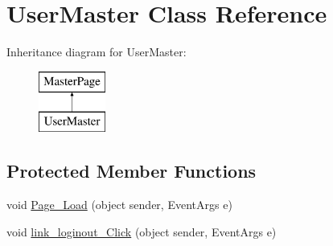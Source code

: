 \hypertarget{class_user_master}{}\section{User\+Master Class Reference}
\label{class_user_master}
Inheritance diagram for User\+Master\+:\begin{figure}[H]
\begin{center}
\leavevmode
\includegraphics[height=2.000000cm]{class_user_master}
\end{center}
\end{figure}
\subsection*{Protected Member Functions}
\begin{DoxyCompactItemize}
\item 
void \mbox{\hyperlink{class_user_master_aca92d74fee906c87a0a5a389f71a58b5}{Page\+\_\+\+Load}} (object sender, Event\+Args e)
\item 
void \mbox{\hyperlink{class_user_master_abeb36094df51b51f9ce219be80538053}{link\+\_\+loginout\+\_\+\+Click}} (object sender, Event\+Args e)
\end{DoxyCompactItemize}
